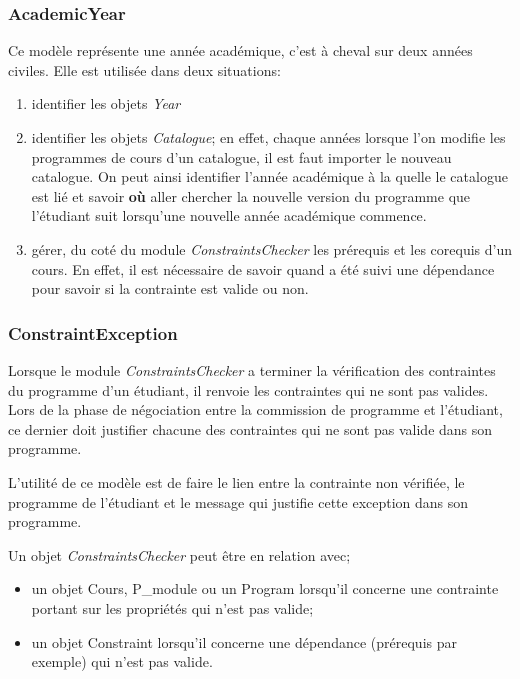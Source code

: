 \subsubsection{AcademicYear}
Ce modèle représente une année académique, c'est à cheval sur deux années civiles. Elle est utilisée dans deux situations:
\begin{enumerate}
  \item identifier les objets \textit{Year} 
  \item identifier les objets \textit{Catalogue}; en effet, chaque années lorsque l'on modifie les programmes de cours d'un catalogue, il est faut importer le nouveau catalogue. On peut ainsi identifier l'année académique à la quelle le catalogue est lié et savoir \textbf{où} aller chercher la nouvelle version du programme que l'étudiant suit lorsqu'une nouvelle année académique commence.
  \item gérer, du coté du module \textit{ConstraintsChecker} les prérequis et les corequis d'un cours. En effet, il est nécessaire de savoir quand a été suivi une dépendance pour savoir si la contrainte est valide ou non. 
\end{enumerate}

\subsubsection{ConstraintException}
Lorsque le module \textit{ConstraintsChecker} a terminer la vérification des contraintes du programme d'un étudiant, il renvoie les contraintes qui ne sont pas valides. Lors de la phase de négociation entre la commission de programme et l'étudiant, ce dernier doit justifier chacune des contraintes qui ne sont pas valide dans son programme.

L'utilité de ce modèle est de faire le lien entre la contrainte non vérifiée, le programme de l'étudiant et le message qui justifie cette exception dans son programme. 

Un objet \textit{ConstraintsChecker} peut être en relation avec;

\begin{itemize}
\item un objet Cours, P\_module ou un Program lorsqu’il concerne une contrainte portant sur les propriétés qui n'est pas valide;
\item un objet Constraint lorsqu'il concerne une dépendance (prérequis par exemple) qui n'est pas valide.
\end{itemize}

